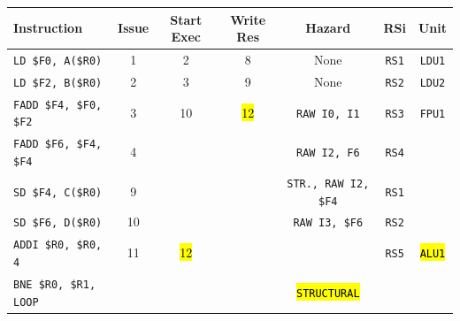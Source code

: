 \begin{enumerate}
    \begin{table}[!htp]
        \centering
        \begin{adjustbox}{width={\textwidth},totalheight={\textheight},keepaspectratio}
        \begin{tabular}{@{} l c c c c c c @{}}
            \toprule
            \textbf{Instruction} & \textbf{Issue} & \textbf{Start Exec} & \textbf{Write Res} & \textbf{Hazard} & \textbf{RSi} & \textbf{Unit} \\
            \midrule
            \texttt{LD \$F0, A(\$R0)}       & 1 & 2 & 8 & None  & \texttt{RS1}   & \texttt{LDU1}  \\ [.5em]
            \texttt{LD \$F2, B(\$R0)}       & 2 & 3 & 9 & None  & \texttt{RS2}   & \texttt{LDU2}  \\ [.5em]
            \texttt{FADD \$F4, \$F0, \$F2}  & 3 & 10 & \hl{12} & \texttt{RAW I0, I1} & \texttt{RS3} & \texttt{FPU1} \\ [.5em]
            \texttt{FADD \$F6, \$F4, \$F4}  & 4 &   &   & \texttt{RAW I2, F6} & \texttt{RS4} & \\ [.5em]
            \texttt{SD \$F4, C(\$R0)}       & 9 &   &   & \texttt{STR., RAW I2, \$F4} & \texttt{RS1} & \\ [.5em]
            \texttt{SD \$F6, D(\$R0)}       & 10 &   &   & \texttt{RAW I3, \$F6} & \texttt{RS2} &       \\ [.5em]
            \texttt{ADDI \$R0, \$R0, 4}     & 11 & \hl{12} &   &       & \texttt{RS5} & \hl{\texttt{ALU1}} \\ [.5em]
            \texttt{BNE \$R0, \$R1, LOOP}   &   &   &   & \hl{\texttt{STRUCTURAL}} &       &       \\
            \bottomrule
        \end{tabular}
        \end{adjustbox}
    \end{table}
    

\end{enumerate}
